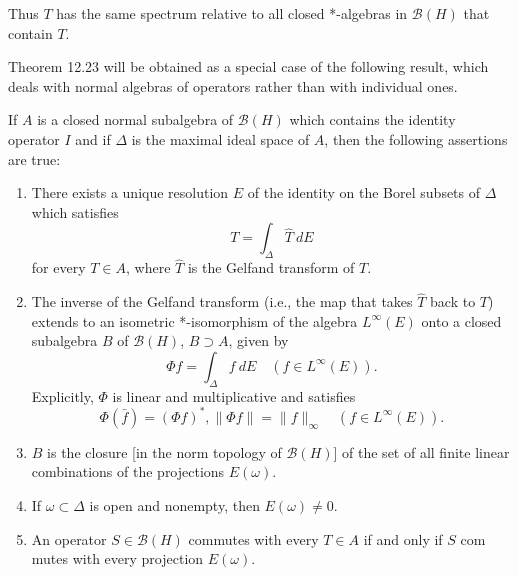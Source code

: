 Thus $T$ has the same spectrum relative to all closed *-algebras in $\mathcal{B}(H)$ that contain $T$.

Theorem 12.23 will be obtained as a special case of the following result, which deals with normal algebras of operators rather than with individual ones.

\begin{theorem}[12.22]

  If $A$ is a closed normal subalgebra of $\mathcal{B}(H)$ which contains the identity operator $I$ and if $\Delta$ is the maximal ideal space of $A$, then the following assertions are true:

  \begin{enumerate}
    \item \label{itm:a} There exists a unique resolution $E$ of the identity on the Borel subsets of $\Delta$ which satisfies
          \begin{equation}
            \label{eq:1}
            T = \int_\Delta \widehat{T} \ dE
          \end{equation}
          for every $T \in A$, where $\widehat{T}$ is the Gelfand transform of $T$.
    \item \label{itm:b} The inverse of the Gelfand transform (i.e., the map that takes $\widehat{T}$ back to $T$) extends to an isometric *-isomorphism of the algebra \(L^\infty(E)\) onto a closed subalgebra $B$ of $\mathcal{B}(H)$, $B\supset A$, given by
          \begin{equation}
            \label{eq:2}
            \Phi f = \int_\Delta f \ dE \quad (f \in L^\infty(E)).
          \end{equation}
          Explicitly, $\Phi$ is linear and multiplicative and satisfies
          \[
            \Phi(\bar{f}) = (\Phi f)^*, \| \Phi f \| = \| f \|_{\infty} \quad (f \in L^\infty(E)).
          \]
    \item \label{itm:c}  $B$ is the closure [in the norm topology of  $\mathcal{B}(H)$] of the set of all finite linear combinations of the projections $E(\omega)$.
    \item \label{itm:d}  If $\omega \subset \Delta$ is open and nonempty, then $E(\omega) \neq 0$.
    \item \label{itm:e}  An operator $S \in \mathcal{B}(H)$ commutes with every $T \in A$ if and only if $S$ com mutes with every projection $E(\omega)$.
  \end{enumerate}
\end{theorem}

